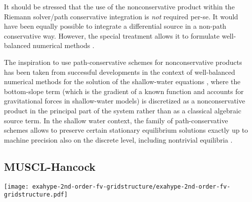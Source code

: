 It should be stressed that the use of the nonconservative product within the
Riemann solver/path conservative integration is \emph{not} required per-se.
It would have been equally possible to integrate a differential source in a
non-path conservative way. However, the special treatment allows it to formulate
well-balanced numerical methods \cite{Bermudez1994}. 

The inspiration to use {path-conservative} schemes for
nonconservative products has been taken from successful developments in
the context of  {well-balanced} numerical methods
for the solution of the shallow-water equations 
\cite{Pares2006,Castro2006,Castro2010},
where the bottom-slope term (which is the gradient of a known
function and accounts for gravitational forces in shallow-water models) is 
discretized as a nonconservative product in the principal part of the
system rather than as a classical algebraic source term. In the shallow
water context, the family of path-conservative schemes allows to preserve
certain stationary equilibrium solutions {exactly} up to machine
precision also on the discrete level, including nontrivial equilibria
\cite{Gaburro2017,Gaburro2018}.



\subsection{MUSCL-Hancock}\label{sec:MUSCL}
\begin{marginfigure}[3cm]
	\texttt{[image: exahype-2nd-order-fv-gridstructure/exahype-2nd-order-fv-gridstructure.pdf]}
	\caption[2nd order FV ExaHyPE ghost cell problem, drawn with Inkscape, 
	\exclusive]%
	{
       Cartoon of the ghost cell optimization in :
       Patches are denoted with upper case letters ($\mathbb A$, $\mathbb B$,
       $\mathbb C$), while embedded FV subcells are denoted with lowercase
       letters ($\mathbb a$, $\mathbb b$, $\mathbb c$). The letter $a$ refers
       to the patch/cell which solution shall be computed. The letters $b$
       refer to their direct neighbours (sharing a face), while the letters
       $c$ refer to the corners (sharing an edge).
       Two ghost layers are drawn.
       Here, the information in the domain $\mathbb C \cap \mathbb c$ is
       not available.}\label{fig:muscl-exahype}
\end{marginfigure}

